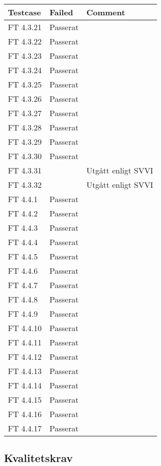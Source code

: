 \documentclass[a4paper]{article}
\begin{document}
\begin{tabular}{| l | l | p{11cm} |}
\hline
Testcase &  Failed & Comment\\
\hline
FT 4.3.21 & Passerat & \\
\hline
FT 4.3.22 & Passerat & \\
\hline
FT 4.3.23 & Passerat & \\
\hline
FT 4.3.24 & Passerat & \\
\hline
FT 4.3.25 & Passerat & \\
\hline
FT 4.3.26 & Passerat & \\
\hline
FT 4.3.27 & Passerat & \\
\hline
FT 4.3.28 & Passerat & \\
\hline
FT 4.3.29 & Passerat & \\
\hline
FT 4.3.30 & Passerat & \\
\hline
FT 4.3.31 & & Utgått enligt SVVI\\
\hline
FT 4.3.32 & & Utgått enligt SVVI\\
\hline
FT 4.4.1 & Passerat & \\
\hline
FT 4.4.2 & Passerat & \\
\hline
FT 4.4.3 & Passerat & \\
\hline
FT 4.4.4 & Passerat & \\
\hline
FT 4.4.5 & Passerat & \\
\hline
FT 4.4.6 & Passerat & \\
\hline
FT 4.4.7 & Passerat & \\
\hline
FT 4.4.8 & Passerat & \\
\hline
FT 4.4.9 & Passerat & \\
\hline
FT 4.4.10 & Passerat & \\
\hline
FT 4.4.11 & Passerat & \\
\hline
FT 4.4.12 & Passerat & \\
\hline
FT 4.4.13 & Passerat & \\
\hline
FT 4.4.14 & Passerat & \\
\hline
FT 4.4.15 & Passerat & \\
\hline
FT 4.4.16 & Passerat & \\
\hline
FT 4.4.17 & Passerat & \\
\hline
\end{tabular}



\subsection{Kvalitetskrav}
\end{document}
